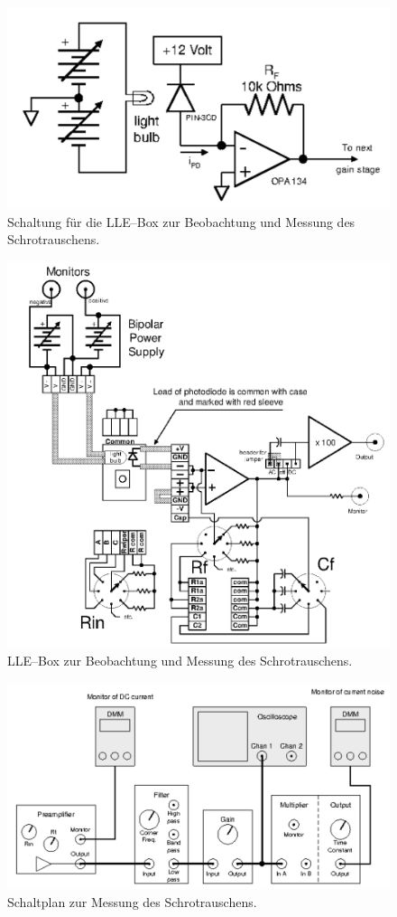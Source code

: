 \documentclass[sn-mathphys-num,iicol]{sn-jnl}
\theoremstyle{thmstyleone}
\theoremstyle{thmstyletwo}
\theoremstyle{thmstylethree}
\begin{document}
\begin{figure}[t]
        \centering
        \includegraphics[width=.5\textwidth]{425_schaltplan_visualisierung_schort_LLE.png}
        \caption{Schaltung für die LLE--Box zur Beobachtung und Messung des Schrotrauschens.\cite{anleitung425}} \label{fig:schrot_lle_beob}
\end{figure}
\begin{figure}[t]
        \centering
        \includegraphics[width=.5\textwidth]{425_schaltplan_messung_schrot_LLE.png}
        \caption{LLE--Box zur Beobachtung und Messung des Schrotrauschens.\cite{anleitung425}} \label{fig:schrot_lle_mess}
\end{figure}
\begin{figure}[t]
        \centering
        \includegraphics[width=.5\textwidth]{425_schaltplan_messung_schrot.png}
        \caption{Schaltplan zur Messung des Schrotrauschens.\cite{anleitung425}} \label{fig:schaltplan_schrot_mess}
\end{figure}
\end{document}
